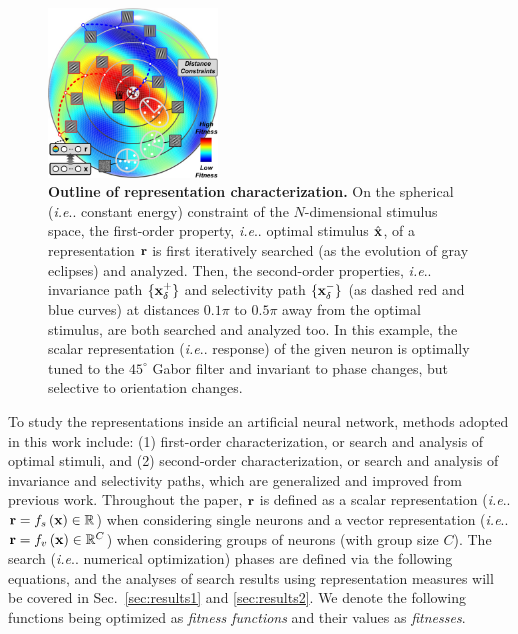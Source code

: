 \documentclass[fleqn]{article} %
\makeatletter
\DeclareRobustCommand\onedot{\futurelet\@let@token\@onedot}
\def\@onedot{\ifx\@let@token.\else.\null\fi\xspace}
\def\ie{\emph{i.e}\onedot} \def\Ie{\emph{I.e}\onedot}
\makeatother
\begin{document}
\begin{figure}
\includegraphics[width=0.40\textwidth, clip]{Figs/methods.pdf}
\caption{{\bf Outline of representation characterization.}
On the spherical (\ie constant energy) constraint of the $N$-dimensional stimulus space, the first-order property, \ie optimal stimulus $\hat{\bf{x}}$, of a representation $\bf{r}$ is first iteratively searched \cite{hansen2001completely} (as the evolution of gray eclipses) and analyzed.
Then, the second-order properties, \ie invariance path $\lbrace \bf{x}^{+}_{\delta} \rbrace$ and selectivity path $\lbrace \bf{x}^{-}_{\delta} \rbrace$ (as dashed red and blue curves) at distances $0.1\pi$ to $0.5\pi$ away from the optimal stimulus, are both searched and analyzed too.
In this example, the scalar representation (\ie response) of the given neuron is optimally tuned to the $45^{\circ}$ Gabor filter and invariant to phase changes, but selective to orientation changes.
\vspace{1.0ex}}
\label{fig:methods}
\end{figure}



To study the representations inside an artificial neural network, methods adopted in this work include: (1) first-order characterization, or search and analysis of optimal stimuli, and (2) second-order characterization, or search and analysis of invariance and selectivity paths, which are generalized and improved from previous work.
Throughout the paper, $\bf{r}$ is defined as a scalar representation (\ie ${\bf{r}} = f_s\left({\bf{x}}\right) \in \mathbb{R}$) when considering single neurons and a vector representation (\ie ${\bf{r}} = f_v\left({\bf{x}}\right) \in \mathbb{R}^C$) when considering groups of neurons (with group size $C$).
The search (\ie numerical optimization) phases are defined via the following equations, and the analyses of search results using representation measures will be covered in Sec.~\ref{sec:results1} and \ref{sec:results2}. 
We denote the following functions being optimized as \emph{fitness functions} and their values as \emph{fitnesses}.
\end{document}
